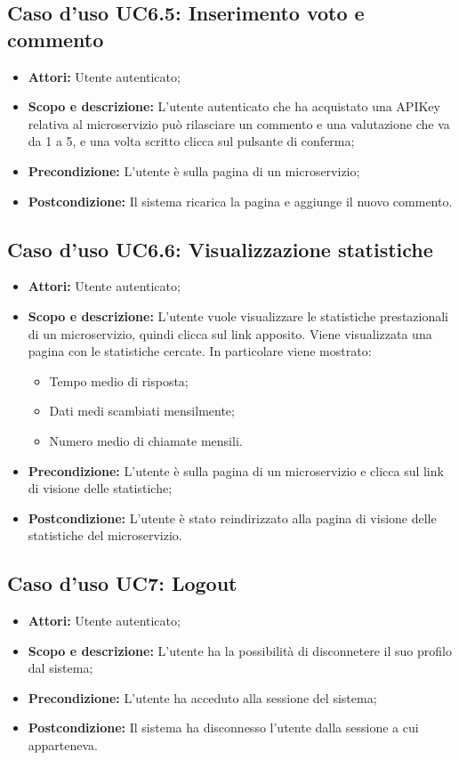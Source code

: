 \documentclass[12pt,a4paper,titlepage]{article}
\begin{document}
	\subsection{Caso d'uso UC6.5: Inserimento voto e commento}
	\label{UC6.5}
	\begin{itemize}
		\item \textbf{Attori: }Utente autenticato;
		\item \textbf{Scopo e descrizione: }L'utente autenticato che ha acquistato una APIKey relativa al microservizio può rilasciare un commento e una valutazione che va da 1 a 5, e una volta scritto clicca sul pulsante di conferma;
		\item \textbf{Precondizione: }L'utente è sulla pagina di un microservizio;
		\item \textbf{Postcondizione: }Il sistema ricarica la pagina e aggiunge il nuovo commento.
	\end{itemize}
	\subsection{Caso d'uso UC6.6: Visualizzazione statistiche }
	\label{UC6.6}
	\begin{itemize}
		\item \textbf{Attori: }Utente autenticato;
		\item \textbf{Scopo e descrizione: }L'utente vuole visualizzare le statistiche prestazionali di un microservizio, quindi clicca sul link apposito. Viene visualizzata una pagina con le statistiche cercate. In particolare viene mostrato:
		\begin{itemize}
			\item Tempo medio di risposta;
			\item Dati medi scambiati mensilmente;
			\item Numero medio di chiamate mensili.
		\end{itemize}
		\item \textbf{Precondizione: }L'utente è sulla pagina di un microservizio e clicca sul link di visione delle statistiche;
		\item \textbf{Postcondizione: }L'utente è stato reindirizzato alla pagina di visione delle statistiche del microservizio.
	\end{itemize}
	\subsection{Caso d'uso UC7: Logout}
	\label{UC7}
	\begin{itemize}
		\item \textbf{Attori: }Utente autenticato;
		\item \textbf{Scopo e descrizione: }L'utente ha la possibilità di disconnetere il suo profilo dal sistema;
		\item \textbf{Precondizione: }L'utente ha acceduto alla sessione del sistema;
		\item \textbf{Postcondizione: }Il sistema ha disconnesso l'utente dalla sessione a cui apparteneva.
	\end{itemize}
\end{document}
